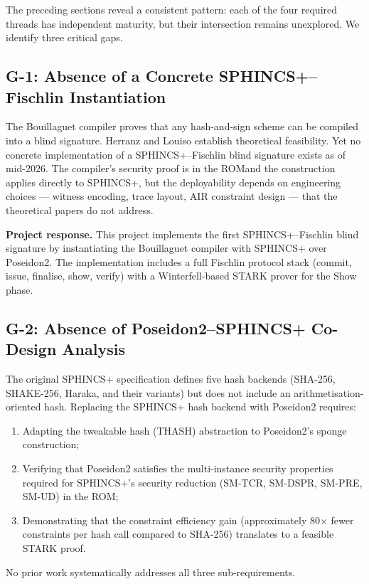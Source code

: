 \documentclass[11pt,a4paper]{article}
\newcommand{\ROM}{\textsf{ROM}}
\begin{document}
The preceding sections reveal a consistent pattern: each of the four required threads has
independent maturity, but their intersection remains unexplored.  We identify three critical
gaps.

\subsection{G-1: Absence of a Concrete SPHINCS+--Fischlin Instantiation}

The Bouillaguet compiler \cite{Bouillaguet2026BlindingPH} proves that any hash-and-sign
scheme can be compiled into a blind signature.  Herranz and Louiso \cite{Herranz2025HashBased}
establish theoretical feasibility.  Yet no concrete implementation of a SPHINCS+--Fischlin
blind signature exists as of mid-2026.  The compiler's security proof is in the \ROM and
the construction applies directly to SPHINCS+, but the deployability depends on engineering
choices --- witness encoding, trace layout, AIR constraint design --- that the theoretical
papers do not address.

\medskip
\noindent\textbf{Project response.}  This project implements the first SPHINCS+--Fischlin
blind signature by instantiating the Bouillaguet compiler with SPHINCS+ over Poseidon2.
The implementation includes a full Fischlin protocol stack (commit, issue, finalise, show,
verify) with a Winterfell-based STARK prover for the Show phase.

\subsection{G-2: Absence of Poseidon2--SPHINCS+ Co-Design Analysis}

The original SPHINCS+ specification \cite{Bernstein2019SPHINCS} defines five hash backends
(SHA-256, SHAKE-256, Haraka, and their variants) but does not include an
arithmetisation-oriented hash.  Replacing the SPHINCS+ hash backend with Poseidon2 requires:
\begin{enumerate}
  \item Adapting the tweakable hash (THASH) abstraction to Poseidon2's sponge construction;
  \item Verifying that Poseidon2 satisfies the multi-instance security properties required for
        SPHINCS+'s security reduction (SM-TCR, SM-DSPR, SM-PRE, SM-UD) in the \ROM;
  \item Demonstrating that the constraint efficiency gain (approximately 80$\times$ fewer
        constraints per hash call compared to SHA-256) translates to a feasible STARK proof.
\end{enumerate}
No prior work systematically addresses all three sub-requirements.
\end{document}
